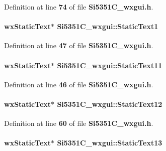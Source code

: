 Definition at line {\bf 74} of file {\bf Si5351\+C\+\_\+wxgui.\+h}.

\paragraph[{Static\+Text1}]{\setlength{\rightskip}{0pt plus 5cm}wx\+Static\+Text$\ast$ Si5351\+C\+\_\+wxgui\+::\+Static\+Text1}\label{classSi5351C__wxgui_aa8e22dc4a5d9bf8bdcfb4f6078cd1275}


Definition at line {\bf 47} of file {\bf Si5351\+C\+\_\+wxgui.\+h}.

\paragraph[{Static\+Text11}]{\setlength{\rightskip}{0pt plus 5cm}wx\+Static\+Text$\ast$ Si5351\+C\+\_\+wxgui\+::\+Static\+Text11}\label{classSi5351C__wxgui_a4a635e53ddd0d6b0650b8ed940b14a86}


Definition at line {\bf 46} of file {\bf Si5351\+C\+\_\+wxgui.\+h}.

\paragraph[{Static\+Text12}]{\setlength{\rightskip}{0pt plus 5cm}wx\+Static\+Text$\ast$ Si5351\+C\+\_\+wxgui\+::\+Static\+Text12}\label{classSi5351C__wxgui_a9dd4a637ce63b1eecaefd9cbce821bc8}


Definition at line {\bf 60} of file {\bf Si5351\+C\+\_\+wxgui.\+h}.

\paragraph[{Static\+Text13}]{\setlength{\rightskip}{0pt plus 5cm}wx\+Static\+Text$\ast$ Si5351\+C\+\_\+wxgui\+::\+Static\+Text13}\label{classSi5351C__wxgui_a5c0c41f4eb56bb6cc655d6768149eed3}


